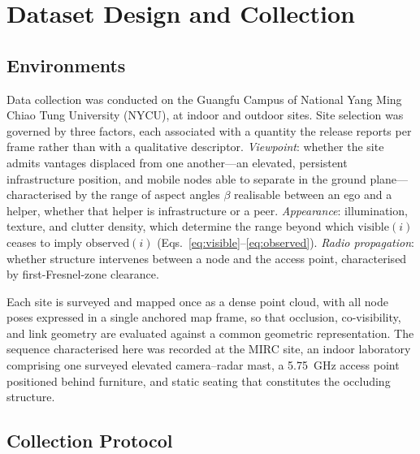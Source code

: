 \section{Dataset Design and Collection}
\label{sec:collection}

\subsection{Environments}
\label{sec:environments}

Data collection was conducted on the Guangfu Campus of National Yang Ming Chiao
Tung University (NYCU), at indoor and outdoor sites. Site selection was governed
by three factors, each associated with a quantity the release reports per frame
rather than with a qualitative descriptor. \textit{Viewpoint}: whether the site
admits vantages displaced from one another---an elevated, persistent
infrastructure position, and mobile nodes able to separate in the ground
plane---characterised by the range of aspect angles $\beta$ realisable between
an ego and a helper, whether that helper is infrastructure or a peer.
\textit{Appearance}: illumination, texture, and clutter density, which determine
the range beyond which $\mathrm{visible}(i)$ ceases to imply
$\mathrm{observed}(i)$ (Eqs.~\eqref{eq:visible}--\eqref{eq:observed}).
\textit{Radio propagation}: whether structure intervenes between a node and the
access point, characterised by first-Fresnel-zone clearance.

Each site is surveyed and mapped once as a dense point cloud, with all node
poses expressed in a single anchored map frame, so that occlusion,
co-visibility, and link geometry are evaluated against a common geometric
representation. The sequence characterised here was recorded at the MIRC site,
an indoor laboratory comprising one surveyed elevated camera--radar mast, a
\SI{5.75}{\giga\hertz} access point positioned behind furniture, and static
seating that constitutes the occluding structure.


\subsection{Collection Protocol}

